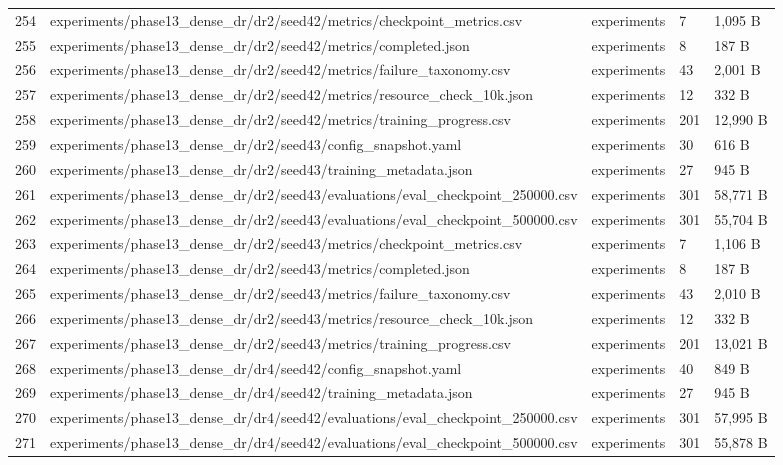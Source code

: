 \documentclass[11pt,a4paper,oneside]{book}
\begin{document}
\begin{longtable}{l l l l l}
254 & experiments/phase13\_dense\_dr/dr2/seed42/metrics/checkpoint\_metrics.csv & experiments & 7 & 1,095 B \\
255 & experiments/phase13\_dense\_dr/dr2/seed42/metrics/completed.json & experiments & 8 & 187 B \\
256 & experiments/phase13\_dense\_dr/dr2/seed42/metrics/failure\_taxonomy.csv & experiments & 43 & 2,001 B \\
257 & experiments/phase13\_dense\_dr/dr2/seed42/metrics/resource\_check\_10k.json & experiments & 12 & 332 B \\
258 & experiments/phase13\_dense\_dr/dr2/seed42/metrics/training\_progress.csv & experiments & 201 & 12,990 B \\
259 & experiments/phase13\_dense\_dr/dr2/seed43/config\_snapshot.yaml & experiments & 30 & 616 B \\
260 & experiments/phase13\_dense\_dr/dr2/seed43/training\_metadata.json & experiments & 27 & 945 B \\
261 & experiments/phase13\_dense\_dr/dr2/seed43/evaluations/eval\_checkpoint\_250000.csv & experiments & 301 & 58,771 B \\
262 & experiments/phase13\_dense\_dr/dr2/seed43/evaluations/eval\_checkpoint\_500000.csv & experiments & 301 & 55,704 B \\
263 & experiments/phase13\_dense\_dr/dr2/seed43/metrics/checkpoint\_metrics.csv & experiments & 7 & 1,106 B \\
264 & experiments/phase13\_dense\_dr/dr2/seed43/metrics/completed.json & experiments & 8 & 187 B \\
265 & experiments/phase13\_dense\_dr/dr2/seed43/metrics/failure\_taxonomy.csv & experiments & 43 & 2,010 B \\
266 & experiments/phase13\_dense\_dr/dr2/seed43/metrics/resource\_check\_10k.json & experiments & 12 & 332 B \\
267 & experiments/phase13\_dense\_dr/dr2/seed43/metrics/training\_progress.csv & experiments & 201 & 13,021 B \\
268 & experiments/phase13\_dense\_dr/dr4/seed42/config\_snapshot.yaml & experiments & 40 & 849 B \\
269 & experiments/phase13\_dense\_dr/dr4/seed42/training\_metadata.json & experiments & 27 & 945 B \\
270 & experiments/phase13\_dense\_dr/dr4/seed42/evaluations/eval\_checkpoint\_250000.csv & experiments & 301 & 57,995 B \\
271 & experiments/phase13\_dense\_dr/dr4/seed42/evaluations/eval\_checkpoint\_500000.csv & experiments & 301 & 55,878 B \\

\end{longtable}
\end{document}
